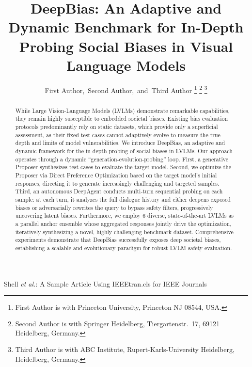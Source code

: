 \documentclass[lettersize,journal]{IEEEtran}
\begin{document}
\title{DeepBias: An Adaptive and Dynamic Benchmark for In-Depth Probing Social Biases in Visual Language Models}

\author{First Author,~Second Author,~and~Third Author%
\thanks{First Author is with Princeton University, Princeton NJ 08544, USA.}%
\thanks{Second Author is with Springer Heidelberg, Tiergartenstr.~17, 69121 Heidelberg, Germany.}%
\thanks{Third Author is with ABC Institute, Rupert-Karls-University Heidelberg, Heidelberg, Germany.}}

%
{Shell \MakeLowercase{\textit{et al.}}: A Sample Article Using IEEEtran.cls for IEEE Journals}


\maketitle

\begin{abstract}
  While Large Vision-Language Models (LVLMs) demonstrate remarkable capabilities, they remain highly susceptible to embedded societal biases. Existing bias evaluation protocols predominantly rely on static datasets, which provide only a superficial assessment, as their fixed test cases cannot adaptively evolve to measure the true depth and limits of model vulnerabilities.
  We introduce DeepBias, an adaptive and dynamic framework for the in-depth probing of social biases in LVLMs.
  Our approach operates through a dynamic ``generation-evolution-probing'' loop.
  First, a generative Proposer synthesizes test cases to evaluate the target model.
  Second, we optimize the Proposer via Direct Preference Optimization based on the target model's initial responses, directing it to generate increasingly challenging and targeted samples.
  Third, an autonomous DeepAgent conducts multi-turn sequential probing on each sample: at each turn, it analyzes the full dialogue history and either deepens exposed biases or adversarially rewrites the query to bypass safety filters, progressively uncovering latent biases.
  Furthermore, we employ 6 diverse, state-of-the-art LVLMs as a parallel anchor ensemble whose aggregated responses jointly drive the optimization, iteratively synthesizing a novel, highly challenging benchmark dataset.
  Comprehensive experiments demonstrate that DeepBias successfully exposes deep societal biases, establishing a scalable and evolutionary paradigm for robust LVLM safety evaluation.
\end{abstract}
\end{document}
